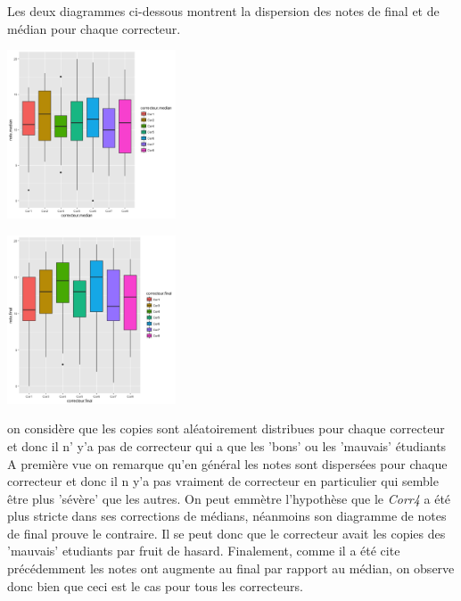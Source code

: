 \documentclass[10pt]{article}
\begin{document}
\begin{minipage}{\linewidth}
	Les deux diagrammes ci-dessous montrent la dispersion des notes de final et de médian pour chaque correcteur.\\
	\begin{minipage}{0.50\linewidth}
	\includegraphics[width=50mm]{Figures/Notes/correcteur_median.png}
	\label{fig:scatter_correcteur_median}
	\end{minipage}
	\hspace{0.01\linewidth}
	\begin{minipage}{0.50\linewidth}	
		\includegraphics[width=50mm]{Figures/Notes/correcteur_final.png}
		\label{fig:scatter_correcteur_median}
	\end{minipage}
\end{minipage}
on considère que les copies sont aléatoirement distribues pour chaque correcteur et donc il n' y'a pas de correcteur qui a que les 'bons' ou les 'mauvais' étudiants A première vue on remarque qu'en général les notes sont dispersées pour chaque correcteur et donc il n y'a pas vraiment de correcteur en particulier qui semble être plus 'sévère' que les autres. On peut emmètre l'hypothèse  que le \textit{Corr4} a été plus stricte dans ses corrections de médians, néanmoins son diagramme de notes de final prouve le contraire. Il se peut donc que le correcteur avait les copies des 'mauvais' etudiants par fruit de hasard. Finalement, comme il a été cite précédemment les notes ont augmente au final par rapport au médian, on observe donc bien que ceci est le cas pour tous les correcteurs.
\end{document}
